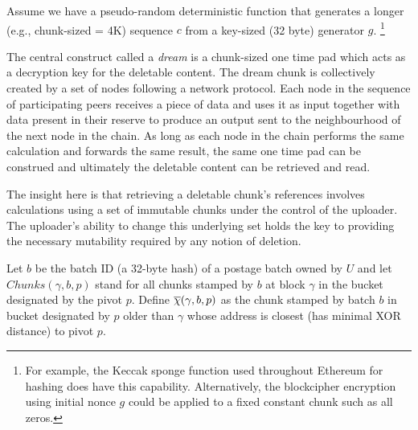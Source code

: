 


Assume we have a pseudo-random deterministic function that generates a longer (e.g., chunk-sized = 4K) sequence $c$ from a key-sized (32 byte) generator $g$.%
%
\footnote{For example, the Keccak sponge function used throughout Ethereum for hashing does have this capability. Alternatively, the blockcipher encryption using initial nonce $g$ could be applied to a  fixed constant chunk such as all zeros.}


The central construct called a \emph{dream} is a chunk-sized one time pad which acts as a decryption key for the deletable content. The dream chunk is collectively created by a set of nodes following a network protocol. Each node in the sequence of participating peers receives a piece of data and uses it as input together with data present in their reserve to produce an output sent to the neighbourhood of the next node in the chain. As long as each node in the chain performs the same calculation and forwards the same result, the same one time pad can be construed and ultimately the deletable content can be retrieved and read.

The insight here is that retrieving a deletable chunk's references involves calculations using a set of immutable chunks under the control of the uploader. The uploader's ability to change this underlying set holds the key to providing the necessary mutability required by any notion of deletion. 
 
Let $b$ be the batch ID (a 32-byte hash) of a postage batch owned by $U$ and 
let $\mathit{Chunks}(\gamma,b,p)$ stand for all chunks stamped by $b$ at block $\gamma$ in the bucket designated by the pivot $p$. Define  $\overline{\Huge\chi}(\gamma,b,p)$ as the chunk stamped by batch $b$ in bucket designated by $p$ older than $\gamma$  whose address is closest (has minimal XOR distance) to pivot $p$.

